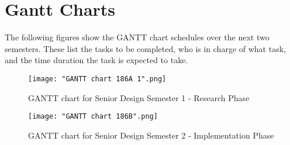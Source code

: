 \section{Gantt Charts}
The following figures show the GANTT chart schedules over the next two semesters. These list the tasks to be completed, who is in charge of what task, and the time duration the task is expected to take.
\begin{figure}[h!]
	\centering
	\texttt{[image: "GANTT chart 186A 1".png]}
	\caption{GANTT chart for Senior Design Semester 1 - Research Phase}
	\label{fig:GANTT186A}
\end{figure}

\newpage

\begin{figure}[h!]
	\centering
	{\texttt{[image: "GANTT chart 186B".png]}}
	\caption{GANTT chart for Senior Design Semester 2 - Implementation Phase}
	\label{fig:GANTT186B}
\end{figure}

